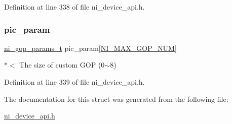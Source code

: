 Definition at line 338 of file ni\+\_\+device\+\_\+api.\+h.

\mbox{\label{struct__ni__custom__gop__params_a97c57dd3d3aade411b670c4fee49612d}} 
\subsubsection{\texorpdfstring{pic\_param}{pic\_param}}
{\footnotesize\ttfamily \mbox{\hyperlink{ni__device__api_8h_a8f3d4340799582c792883fd92878bf9b}{ni\+\_\+gop\+\_\+params\+\_\+t}} pic\+\_\+param\mbox{[}\mbox{\hyperlink{ni__device__api_8h_a4fdb37034e4182c47a5c5e46a1385ff0}{N\+I\+\_\+\+M\+A\+X\+\_\+\+G\+O\+P\+\_\+\+N\+UM}}\mbox{]}}

$\ast$$<$ The size of custom G\+OP (0$\sim$8) 

Definition at line 339 of file ni\+\_\+device\+\_\+api.\+h.



The documentation for this struct was generated from the following file\+:\begin{DoxyCompactItemize}
\item 
\mbox{\hyperlink{ni__device__api_8h}{ni\+\_\+device\+\_\+api.\+h}}\end{DoxyCompactItemize}
